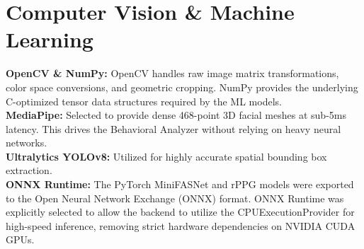 \section{Computer Vision \& Machine Learning}
\textbf{OpenCV \& NumPy:} OpenCV handles raw image matrix transformations, color space conversions, and geometric cropping. NumPy provides the underlying C-optimized tensor data structures required by the ML models.
\\
\textbf{MediaPipe:} Selected to provide dense 468-point 3D facial meshes at sub-5ms latency. This drives the Behavioral Analyzer without relying on heavy neural networks.
\\
\textbf{Ultralytics YOLOv8:} Utilized for highly accurate spatial bounding box extraction. 
\\
\textbf{ONNX Runtime:} The PyTorch MiniFASNet and rPPG models were exported to the Open Neural Network Exchange (ONNX) format. ONNX Runtime was explicitly selected to allow the backend to utilize the CPUExecutionProvider for high-speed inference, removing strict hardware dependencies on NVIDIA CUDA GPUs.

